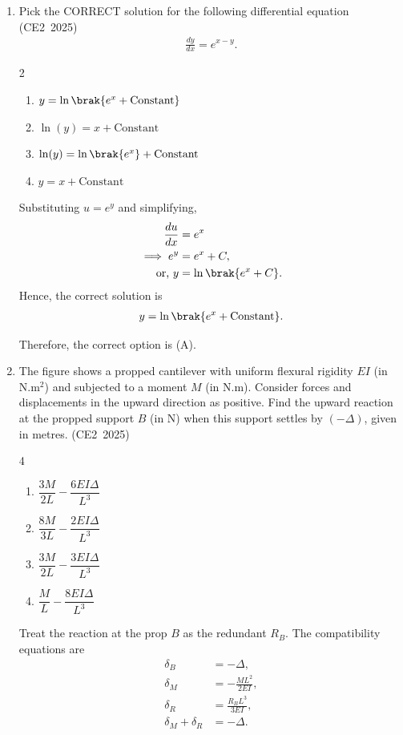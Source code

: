 \begin{enumerate}[label=\thesubsection.\arabic*, ref=\thesubsection.\theenumi,itemsep=0pt]
\item
Pick the CORRECT solution for the following differential equation
\hfill (CE2~2025)
\begin{align}
\frac{dy}{dx}=e^{x-y}.
\end{align}
%
\begin{multicols}{2}\begin{enumerate}
    \item $y=\ln\brak{e^x+\text{Constant}}$
    \item $\ln(y)=x+\text{Constant}$
    \item $\ln(y)=\ln\brak{e^x}+\text{Constant}$
    \item $y=x+\text{Constant}$
\end{enumerate}\end{multicols}
%
\solution
Substituting $u=e^y$ and simplifying,
\begin{align}
\frac{du}{dx}&=e^x
\\
\implies e^y&=e^x+C,
\\
\text{or, }y&=\ln\brak{e^x+C}.
\end{align}
%
\iffalse
Hence, the correct solution is
\begin{align}
y=\ln\brak{e^x+\text{Constant}}.
\end{align}

Therefore, the correct option is (A).


\item
The figure shows a propped cantilever with uniform flexural rigidity $EI$
(in N.m$^2$) and subjected to a moment $M$ (in N.m). Consider forces and
displacements in the upward direction as positive. Find the upward reaction
at the propped support $B$ (in N) when this support settles by $(-\Delta)$,
given in metres.
\hfill (CE2~2025)

\begin{multicols}{4}\begin{enumerate}
    \item $\dfrac{3M}{2L}-\dfrac{6EI\Delta}{L^3}$
    \item $\dfrac{8M}{3L}-\dfrac{2EI\Delta}{L^3}$
    \item $\dfrac{3M}{2L}-\dfrac{3EI\Delta}{L^3}$
    \item $\dfrac{M}{L}-\dfrac{8EI\Delta}{L^3}$
\end{enumerate}\end{multicols}

\solution
Treat the reaction at the prop $B$ as the redundant $R_B$.
The compatibility equations are
\begin{align}
\delta_B&=-\Delta,\\
\delta_M&=-\frac{ML^2}{2EI},\\
\delta_R&=\frac{R_BL^3}{3EI},\\
\delta_M+\delta_R&=-\Delta.
\end{align}


\end{enumerate}
